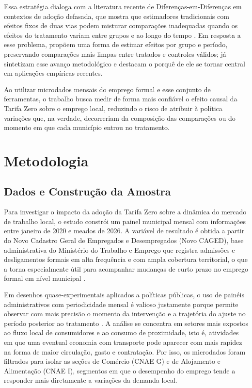 \documentclass[12pt, a4paper]{article}
\begin{document}
Essa estratégia dialoga com a literatura recente de Diferenças-em-Diferenças em contextos de adoção defasada, que mostra que estimadores tradicionais com efeitos fixos de duas vias podem misturar comparações inadequadas quando os efeitos do tratamento variam entre grupos e ao longo do tempo \citep{DechaisematinDhaultfoeuille2020, goodman2021}.
Em resposta a esse problema, \citet{CallawaySantanna2021} propõem uma forma de estimar efeitos por grupo e período, preservando comparações mais limpas entre tratados e controles válidos; já \citet{rothsantannabilinskipoe2023} sintetizam esse avanço metodológico e destacam o porquê de ele se tornar central em aplicações empíricas recentes.

Ao utilizar microdados mensais do emprego formal e esse conjunto de ferramentas, o trabalho busca medir de forma mais confiável o efeito causal da Tarifa Zero sobre o emprego local, reduzindo o risco de atribuir à política variações que, na verdade, decorreriam da composição das comparações ou do momento em que cada município entrou no tratamento.

\section{Metodologia}
\subsection{Dados e Construção da Amostra}
Para investigar o impacto da adoção da Tarifa Zero sobre a dinâmica do mercado de trabalho local, o estudo constrói um painel municipal mensal com informações entre janeiro de 2020 e meados de 2026. A variável de resultado é obtida a partir do Novo Cadastro Geral de Empregados e Desempregados (Novo CAGED), base administrativa do Ministério do Trabalho e Emprego que registra admissões e desligamentos formais em alta frequência e com ampla cobertura territorial, o que a torna especialmente útil para acompanhar mudanças de curto prazo no emprego formal em nível municipal \citep{Brasil2026}.

Em desenhos quase-experimentais aplicados a políticas públicas, o uso de painéis administrativos com periodicidade mensal é valioso justamente porque permite observar com mais precisão o momento da intervenção e a trajetória do ajuste no período posterior ao tratamento \citep{FredrikssonOliveira2019, BakerCallawayCunninghamGoodmanSantanna2025}.
A análise se concentra em setores mais expostos ao fluxo local de consumidores e ao consumo de proximidade, isto é, atividades em que uma eventual economia com transporte pode aparecer com mais rapidez na forma de maior circulação, gasto e contratação.
Por isso, os microdados foram filtrados para isolar as seções de Comércio (CNAE G) e de Alojamento e Alimentação (CNAE I), segmentos em que o desempenho do emprego tende a responder mais diretamente a variações da demanda local.
\end{document}
